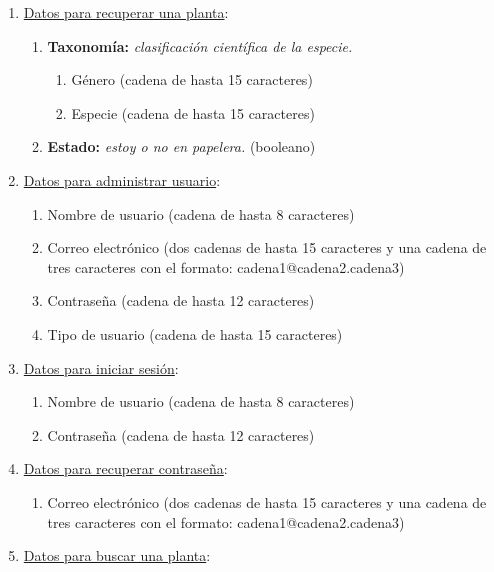 \documentclass[10pt,a4paper]{article}
\begin{document}
\begin{enumerate}[label={RD\arabic*.} ,leftmargin=2.8\parindent]
	\item \underline{Datos para recuperar una planta}:
	\begin{enumerate}[label={RD5.\arabic*.}]
		\item 
		\textbf{Taxonomía:} \textit{clasificación científica de la especie.}
	\begin{enumerate}[label=-]
		\item Género (cadena de hasta 15 caracteres)
		\item Especie (cadena de hasta 15 caracteres)
	\end{enumerate}
		\medskip 
	\item
		\textbf{Estado:} \textit{estoy o no en papelera.} (booleano)	
	\medskip 
	\medskip
	\end{enumerate}
	
	\item \underline{Datos para administrar usuario}:
	\begin{enumerate}[label={RD6.\arabic*.}]
		\medskip
		\item Nombre de usuario (cadena de hasta 8 caracteres)
		\item Correo electrónico (dos cadenas de hasta 15 caracteres y una cadena de tres caracteres con el formato: cadena1@cadena2.cadena3)
		\item Contraseña (cadena de hasta 12 caracteres)
		\item Tipo de usuario (cadena de hasta 15 caracteres)
		\medskip \medskip
		\end{enumerate}

	\item \underline{Datos para iniciar sesión}:
	\begin{enumerate}[label={RD7.\arabic*.}]
		\medskip
		\item Nombre de usuario (cadena de hasta 8 caracteres)
		\item Contraseña (cadena de hasta 12 caracteres)
		\medskip \medskip
		\end{enumerate}

	\item \underline{Datos para recuperar contraseña}:
	\begin{enumerate}[label={RD8.\arabic*.}]
		\medskip
		\item Correo electrónico (dos cadenas de hasta 15 caracteres y una cadena de tres caracteres con el formato: cadena1@cadena2.cadena3)
		\medskip \medskip
		\end{enumerate}
		
 	\item \underline{Datos para buscar una planta}:
	\begin{enumerate}[label={RD9.\arabic*.}]
	

\end{enumerate}
\end{enumerate}
\end{document}
